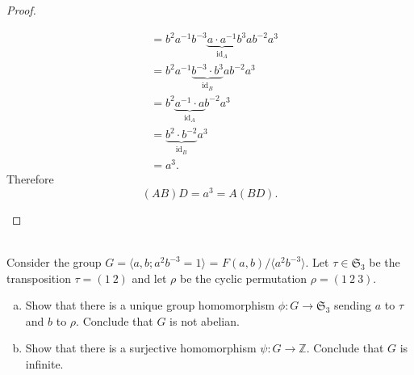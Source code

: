\documentclass{article}
\newenvironment{problem}[2][Problem]{\begin{trivlist}
\item[\hskip \labelsep {\bfseries #1}\hskip \labelsep {\bfseries #2.}]}{\end{trivlist}}
\begin{document}
\begin{proof}
\begin{enumerate}[(a)]
\begin{align*}
         &= b^2 a^{-1} b^{-3} \underbrace{a \cdot a^{-1}}_{\operatorname{id}_A} b^3 a b^{-2} a^3 \\
         &= b^2 a^{-1} \underbrace{b^{-3} \cdot b^{3}}_{\operatorname{id}_B} a b^{-2} a^3 \\
         &= b^2 \underbrace{a^{-1} \cdot a}_{\operatorname{id}_A} b^{-2} a^3 \\
         &= \underbrace{b^2 \cdot b^{-2}}_{\operatorname{id}_B} a^3 \\
         &= a^3.
    \end{align*}
    Therefore \[
      (AB)D = a^3 = A(BD).
    \]
  \end{enumerate}
\end{proof}
\pagebreak
\begin{problem}{2} \text{} \\
  Consider the group $G = \langle a, b; a^2b^{-3} = 1 \rangle$ = $F(a, b)/\langle a^2b^{-3} \rangle$. Let
  $\tau \in \mathfrak S_3$ be the transposition $\tau = (1\ 2)$ and let $\rho$
  be the cyclic permutation $\rho = (1\ 2\ 3)$.
  \begin{enumerate}[a.]
    \item Show that there is a unique group homomorphism
    $\phi\colon G \rightarrow \mathfrak S_3$ sending $a$ to $\tau$ and $b$ to
    $\rho$. Conclude that $G$ is not abelian.
    \item Show that there is a surjective homomorphism
    $\psi\colon G \rightarrow \mathbb Z$. Conclude that $G$ is infinite.
  \end{enumerate}
\end{problem}
\end{document}

